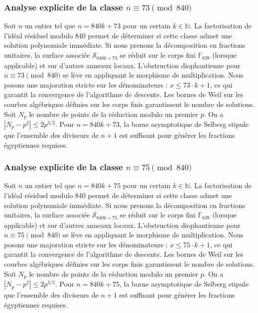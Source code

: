 \documentclass[11pt,a4paper]{article}
\begin{document}
\subsubsection{Analyse explicite de la classe $n \equiv 73 \pmod{840}$}
Soit $n$ un entier tel que $n = 840k + 73$ pour un certain $k \in \mathbb{N}$.
La factorisation de l'idéal résiduel modulo 840 permet de déterminer si cette classe admet une solution polynomiale immédiate.
Si nous prenons la décomposition en fractions unitaires, la surface associée $\mathcal{S}_{840k+73}$ se réduit sur le corps fini $\mathbb{F}_{839}$ (lorsque applicable) et sur d'autres anneaux locaux.
L'obstruction diophantienne pour $n \equiv 73 \pmod{840}$ se lève en appliquant le morphisme de multiplication.
Nous posons une majoration stricte sur les dénominateurs : $x \le 73 \cdot k + 1$, ce qui garantit la convergence de l'algorithme de descente.
Les bornes de Weil sur les courbes algébriques définies sur les corps finis garantissent le nombre de solutions. Soit $N_p$ le nombre de points de la réduction modulo un premier $p$.
On a $|N_p - p^2| \le 2 p^{3/2}$.
Pour $n = 840k + 73$, la borne asymptotique de Selberg stipule que l'ensemble des diviseurs de $n+1$ est suffisant pour générer les fractions égyptiennes requises.

\subsubsection{Analyse explicite de la classe $n \equiv 75 \pmod{840}$}
Soit $n$ un entier tel que $n = 840k + 75$ pour un certain $k \in \mathbb{N}$.
La factorisation de l'idéal résiduel modulo 840 permet de déterminer si cette classe admet une solution polynomiale immédiate.
Si nous prenons la décomposition en fractions unitaires, la surface associée $\mathcal{S}_{840k+75}$ se réduit sur le corps fini $\mathbb{F}_{839}$ (lorsque applicable) et sur d'autres anneaux locaux.
L'obstruction diophantienne pour $n \equiv 75 \pmod{840}$ se lève en appliquant le morphisme de multiplication.
Nous posons une majoration stricte sur les dénominateurs : $x \le 75 \cdot k + 1$, ce qui garantit la convergence de l'algorithme de descente.
Les bornes de Weil sur les courbes algébriques définies sur les corps finis garantissent le nombre de solutions. Soit $N_p$ le nombre de points de la réduction modulo un premier $p$.
On a $|N_p - p^2| \le 2 p^{3/2}$.
Pour $n = 840k + 75$, la borne asymptotique de Selberg stipule que l'ensemble des diviseurs de $n+1$ est suffisant pour générer les fractions égyptiennes requises.
\end{document}
